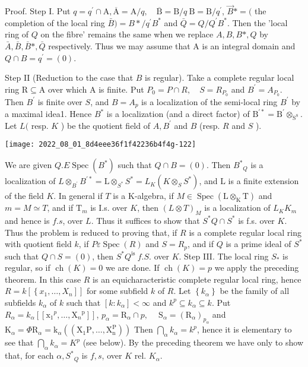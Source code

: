 Proof. Step I. Put $q=q^{\prime} \cap \mathrm{A}, \overline{\mathrm{A}}=\mathrm{A} / q, \quad \overline{\mathrm{B}}=\mathrm{B} / q \mathrm{~B}=\mathrm{B} / q^{\prime}$, $\vec{B} *=($ the completion of the local ring $\bar{B})=B * / q^{\prime} B^{*}$ and $\bar{Q}=Q / Q^{\prime} B^{*}$. Then the 'local ring of $Q$ on the fibre' remains the same when we replace $A, B, B *, Q$ by $\bar{A}, \bar{B}, \bar{B} *, \bar{Q}$ respectively. Thus we may assume that $\mathrm{A}$ is an integral domain and $Q \cap B=q^{\prime}=(0)$.

Step II (Reduction to the case that $B$ is regular). Take a complete regular local ring $\mathrm{R} \subseteq \mathrm{A}$ over which $\mathrm{A}$ is finite. Put $P_{0}=P \cap R, \quad S=R_{P_{0}}$ and $B^{\prime}=A_{P_{0}}$. Then $B^{\prime}$ is finite over $S$, and $B=A_{p}$ is a localization of the semi-local ring $B^{\prime}$ by a maximal idea1. Hence $B^{*}$ is a localization (and a direct factor) of $\mathrm{B}^{\prime *}=\mathrm{B}^{\prime} \otimes_{\mathrm{S}^{\mathrm{S}}}$. Let $L($ resp. $K$ ) be the quotient field of $A, B^{\prime}$ and $B$ (resp. $R$ and $S$ ).

\texttt{[image: 2022\_08\_01\_8d4eee36f1f42236b4f4g-122]}

We are given $Q . E \operatorname{Spec}\left(B^{*}\right)$ such that $Q \cap B=(0)$. Then $B^{*}{ }_{Q}$ is a localization of $L \otimes_{B^{\prime}} B^{\prime *}=\mathrm{L} \otimes_{S^{*}} S^{*}=L_{K}\left(K \otimes_{S} S^{*}\right)$, and $\mathrm{L}$ is a finite extension of the field $K$. In general if $T$ is a $\mathrm{K}$-algebra, if $M \in \operatorname{Spec}\left(\mathrm{L} \otimes_{\mathrm{K}} \mathrm{T}\right)$ and $m=M \simeq T$, and if $\mathrm{T}_{m}$ is I.s. over $K$, then $(L \otimes T)_{M}$ is a localization of $L_{K} K_{m}$ and hence is $f . s$, over $L$. Thus it suffices to show that $S^{*} Q \cap S^{*}$ is f.s. over $K$. Thus the problem is reduced to proving that, if $R$ is a complete regular local ring with quotient field $k$, if $P \varepsilon \operatorname{Spec}(R)$ and $S=R_{p}$, and if $Q$ is a prime ideal of $S^{*}$ such that $Q \cap S=(0)$, then $S^{*} Q^{\text {is }} f . S$. over $K$. Step III. The local ring $S_{*}$ is regular, so if $\operatorname{ch}(K)=0$ we are done. If $\operatorname{ch}(K)=p$ we apply the preceding theorem. In this case $R$ is an equicharacteristic complete regular local ring, hence $R=k\left[\left\{x_{1}, \ldots, X_{n}\right]\right]$ for some subfield $k$ of $R$. Let $\left\{k_{\alpha}\right\}$ be the family of all subfields $k_{\alpha}$ of $k$ such that $\left[k: k_{\alpha}\right]<\infty$ and $k^{p} \subseteq k_{\alpha} \subseteq k$. Put $R_{\alpha}=k_{\alpha}\left[\left[\mathrm{x}_{1}{ }^{p}, \ldots, \mathrm{X}_{n}{ }^{\mathrm{p}}\right]\right]$, $p_{\alpha}=\mathrm{R}_{\alpha} \cap p, \quad \mathrm{~S}_{\alpha}=\left(\mathrm{R}_{\alpha}\right)_{p_{\alpha}}$ and $\mathrm{K}_{\alpha}=\Phi \mathrm{R}_{\alpha}=\mathrm{k}_{\alpha}\left(\left(\mathrm{X}_{1} \mathrm{P}, \ldots, \mathrm{X}_{\mathrm{n}}^{\mathrm{P}}\right)\right)$ Then $\bigcap_{\alpha} k_{\alpha}=k^{p}$, hence it is elementary to see that $\bigcap_{\alpha} k_{\alpha}=K^{p}$ (see below). By the preceding theorem we have only to show that, for each $\alpha, S^{*}{ }_{Q}$ is $f, s$, over $K$ rel. $K_{\alpha}$.

